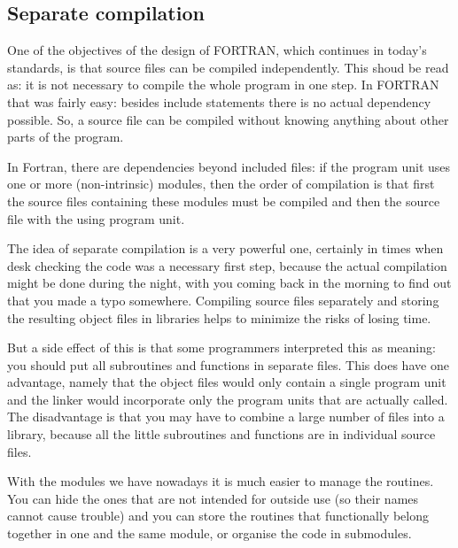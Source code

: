 \subsection{Separate compilation}
One of the objectives of the design of FORTRAN, which continues in today's standards, is that
source files can be compiled independently. This shoud be read as: it is not necessary to
compile the whole program in one step. In FORTRAN that was fairly easy: besides include statements
there is no actual dependency possible. So, a source file can be compiled without knowing anything
about other parts of the program.

In Fortran, there are dependencies beyond included files: if the program unit uses one or more
(non-intrinsic) modules, then the order of compilation is that first the source files containing
these modules must be compiled and then the source file with the using program unit.

The idea of separate compilation is a very powerful one, certainly in times when desk checking
the code was a necessary first step, because the actual compilation might be done during the night,
with you coming back in the morning to find out that you made a typo somewhere. Compiling source files
separately and storing the resulting object files in libraries helps to minimize the risks of
losing time.

But a side effect of this is that some programmers interpreted this as meaning: you should put all
subroutines and functions in separate files. This does have one advantage, namely that the object files
would only contain a single program unit and the linker would incorporate only the program units
that are actually called. The disadvantage is that you may have to combine a large number of
files into a library, because all the little subroutines and functions are in individual source files.

With the modules we have nowadays it is much easier to manage the routines. You can hide the ones
that are not intended for outside use (so their names cannot cause trouble) and you can store
the routines that functionally belong together in one and the same module, or organise the code
in submodules.
